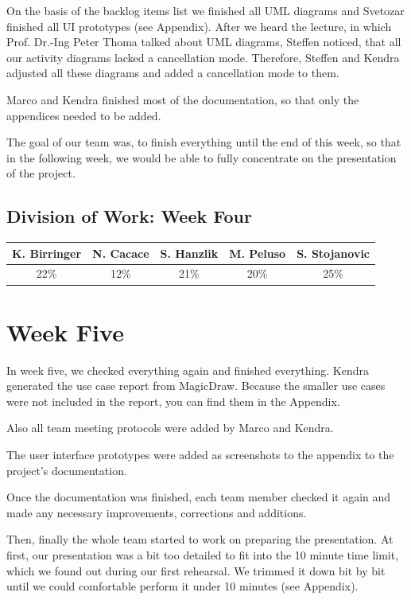 \documentclass[a4paper, 12pt]{article}
\begin{document}
On the basis of the backlog items list we finished all UML diagrams and Svetozar finished all UI prototypes (see Appendix).
After we heard the lecture, in which Prof. Dr.-Ing Peter Thoma talked about UML diagrams, Steffen noticed, that all our activity diagrams lacked a cancellation mode. Therefore, Steffen and Kendra adjusted all these diagrams and added a cancellation mode to them. 

Marco and Kendra finished most of the documentation, so that only the appendices needed to be added.

The goal of our team was, to finish everything until the end of this week, so that in the following week, we would be able to fully concentrate on the presentation of the project.

\subsection{Division of Work: Week Four}

\begin{table}[htbp]
\centering
\setlength{\tabcolsep}{10pt}
\begin{tabular}{|c|c|c|c|c|}
\hline
K. Birringer & N. Cacace & S. Hanzlik & M. Peluso & S. Stojanovic\\
\hline
22\%   &12\%  &21\%  &20\%  &25\%\\
\hline
\end{tabular}
\end{table}

\section{Week Five}
In week five, we checked everything again and finished everything.
Kendra generated the use case report from MagicDraw. Because the smaller use cases were not included in the report, you can find them in the Appendix.

Also all team meeting protocols were added by Marco and Kendra.

The user interface prototypes were added as screenshots to the appendix to the project's documentation.

Once the documentation was finished, each team member checked it again and made any necessary improvements, corrections and additions.

Then, finally the whole team started to work on preparing the presentation. At first, our presentation was a bit too detailed to fit into the 10 minute time limit, which we found out during our first rehearsal. We trimmed it down bit by bit until we could comfortable perform it under 10 minutes (see Appendix).
\end{document}
